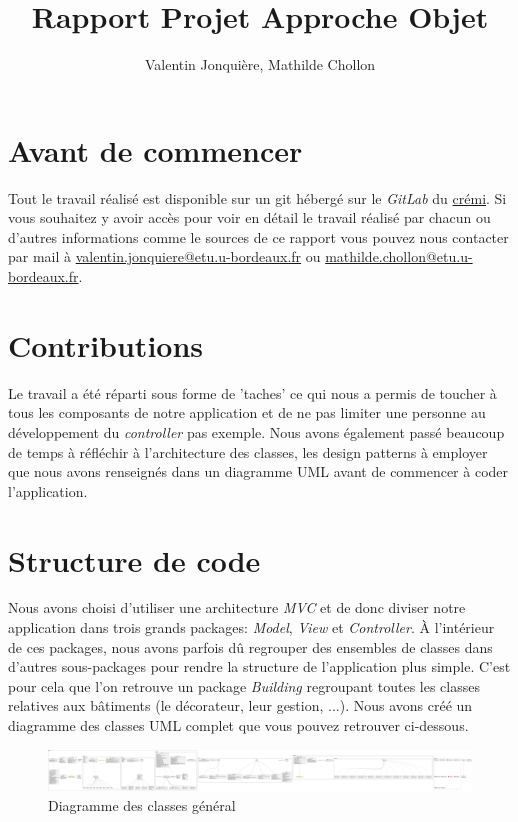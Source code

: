 \documentclass{article}
\author{
    Valentin Jonquière,
    Mathilde Chollon
}
\title{Rapport Projet Approche Objet}
\begin{document}
\maketitle

\pagebreak

\tableofcontents

\pagebreak

\section{Avant de commencer}
Tout le travail réalisé est disponible sur un git hébergé sur le \textit{GitLab} du \href{https://gitlab.emi.u-bordeaux.fr/}{crémi}. Si vous souhaitez y avoir accès 
pour voir en détail le travail réalisé par chacun ou d'autres informations comme le sources de ce rapport vous pouvez nous 
contacter par mail à \href{mailto:valentin.jonquiere@etu.u-bordeaux.fr}{valentin.jonquiere@etu.u-bordeaux.fr} ou 
\href{mailto:mathilde.chollon@etu.u-bordeaux.fr}{mathilde.chollon@etu.u-bordeaux.fr}.

\section{Contributions}
Le travail a été réparti sous forme de 'taches' ce qui nous a permis de toucher à tous les composants de notre application
et de ne pas limiter une personne au développement du \textit{controller} pas exemple. Nous avons également passé beaucoup
de temps à réfléchir à l'architecture des classes, les design patterns à employer que nous avons renseignés dans un diagramme
UML avant de commencer à coder l'application.

\section{Structure de code}
Nous avons choisi d'utiliser une architecture \textit{MVC} et de donc diviser notre application dans trois grands packages: \textit{Model}, \textit{View}
et \textit{Controller}. À l'intérieur de ces packages, nous avons parfois dû regrouper des ensembles de classes dans d'autres sous-packages pour rendre
la structure de l'application plus simple. C'est pour cela que l'on retrouve un package \textit{Building} regroupant toutes les classes relatives
aux bâtiments (le décorateur, leur gestion, ...). Nous avons créé un diagramme des classes UML complet que vous pouvez retrouver ci-dessous.

\begin{figure}[h]
    \caption{Diagramme des classes général}
    \centering
    \includegraphics[width=\textwidth,height=\textheight,keepaspectratio]{complete_UML}
\end{figure}
\end{document}
